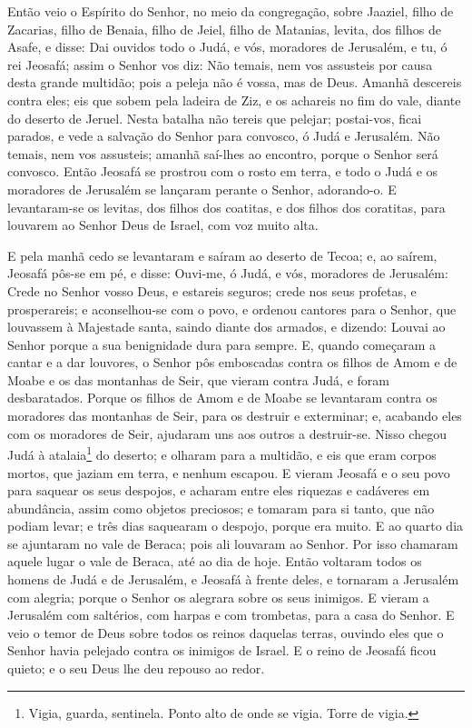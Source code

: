 Então veio o Espírito do Senhor, no meio da congregação, sobre
Jaaziel, filho de Zacarias, filho de Benaia, filho de Jeiel, filho
de Matanias, levita, dos filhos de Asafe, e disse: Dai
ouvidos todo o Judá, e vós, moradores de Jerusalém, e tu, ó rei
Jeosafá; assim o Senhor vos diz: Não temais, nem vos assusteis por
causa desta grande multidão; pois a peleja não é vossa, mas de Deus.
Amanhã descereis contra eles; eis que sobem pela ladeira de
Ziz, e os achareis no fim do vale, diante do deserto de Jeruel.
Nesta batalha não tereis que pelejar; postai-vos, ficai
parados, e vede a salvação do Senhor para convosco, ó Judá e
Jerusalém. Não temais, nem vos assusteis; amanhã saí-lhes ao
encontro, porque o Senhor será convosco. Então Jeosafá se
prostrou com o rosto em terra, e todo o Judá e os moradores de
Jerusalém se lançaram perante o Senhor, adorando-o. E
levantaram-se os levitas, dos filhos dos coatitas, e dos filhos dos
coratitas, para louvarem ao Senhor Deus de Israel, com voz muito
alta.

E pela manhã cedo se levantaram e saíram ao deserto de Tecoa; e,
ao saírem, Jeosafá pôs-se em pé, e disse: Ouvi-me, ó Judá, e vós,
moradores de Jerusalém: Crede no Senhor vosso Deus, e estareis
seguros; crede nos seus profetas, e prosperareis; e
aconselhou-se com o povo, e ordenou cantores para o Senhor, que
louvassem à Majestade santa, saindo diante dos armados, e dizendo:
Louvai ao Senhor porque a sua benignidade dura para sempre.
 E, quando começaram a cantar e a dar louvores, o Senhor pôs
emboscadas contra os filhos de Amom e de Moabe e os das montanhas de
Seir, que vieram contra Judá, e foram desbaratados. Porque os
filhos de Amom e de Moabe se levantaram contra os moradores das
montanhas de Seir, para os destruir e exterminar; e, acabando eles
com os moradores de Seir, ajudaram uns aos outros a destruir-se.
Nisso chegou Judá à atalaia\footnote{Vigia, guarda,
sentinela. Ponto alto de onde se vigia. Torre de vigia.} do deserto;
e olharam para a multidão, e eis que eram corpos mortos, que jaziam
em terra, e nenhum escapou. E vieram Jeosafá e o seu povo
para saquear os seus despojos, e acharam entre eles riquezas e
cadáveres em abundância, assim como objetos preciosos; e tomaram
para si tanto, que não podiam levar; e três dias saquearam o
despojo, porque era muito. E ao quarto dia se ajuntaram no
vale de Beraca; pois ali louvaram ao Senhor. Por isso chamaram
aquele lugar o vale de Beraca, até ao dia de hoje. Então
voltaram todos os homens de Judá e de Jerusalém, e Jeosafá à frente
deles, e tornaram a Jerusalém com alegria; porque o Senhor os
alegrara sobre os seus inimigos. E vieram a Jerusalém com
saltérios, com harpas e com trombetas, para a casa do Senhor.
E veio o temor de Deus sobre todos os reinos daquelas terras,
ouvindo eles que o Senhor havia pelejado contra os inimigos de
Israel. E o reino de Jeosafá ficou quieto; e o seu Deus lhe
deu repouso ao redor.

